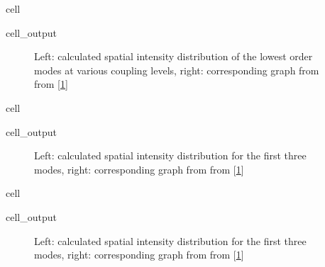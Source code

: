 \documentclass[a4paper,10pt,english,openany,oneside]{jupyterBook}
\begin{document}
\begin{sphinxuseclass}{cell}\begin{sphinxVerbatimOutput}

\begin{sphinxuseclass}{cell_output}
\begin{figure}[htbp]
\centering
\capstart

\noindent{}
\caption{Left: calculated  spatial intensity distribution of the lowest order modes at various coupling levels, right: corresponding graph from from {[}\hyperlink{cite.bib:id3}{1}{]}}\label{\detokenize{Kogelnik-Shank_Coupled-Wave-Theory_DFB-Lasers:kogelnik10c}}\end{figure}

\end{sphinxuseclass}\end{sphinxVerbatimOutput}

\end{sphinxuseclass}
\begin{sphinxuseclass}{cell}\begin{sphinxVerbatimOutput}

\begin{sphinxuseclass}{cell_output}
\begin{figure}[htbp]
\centering
\capstart

\noindent{}
\caption{Left: calculated spatial intensity distribution for the first three modes, right: corresponding graph from from {[}\hyperlink{cite.bib:id3}{1}{]}}\label{\detokenize{Kogelnik-Shank_Coupled-Wave-Theory_DFB-Lasers:kogelnik11ac}}\end{figure}

\end{sphinxuseclass}\end{sphinxVerbatimOutput}

\end{sphinxuseclass}
\begin{sphinxuseclass}{cell}\begin{sphinxVerbatimOutput}

\begin{sphinxuseclass}{cell_output}
\begin{figure}[htbp]
\centering
\capstart

\noindent{}
\caption{Left: calculated spatial intensity distribution for the first three modes, right: corresponding graph from from {[}\hyperlink{cite.bib:id3}{1}{]}}\label{\detokenize{Kogelnik-Shank_Coupled-Wave-Theory_DFB-Lasers:kogelnik11bc}}\end{figure}

\end{sphinxuseclass}\end{sphinxVerbatimOutput}

\end{sphinxuseclass}
\end{document}
